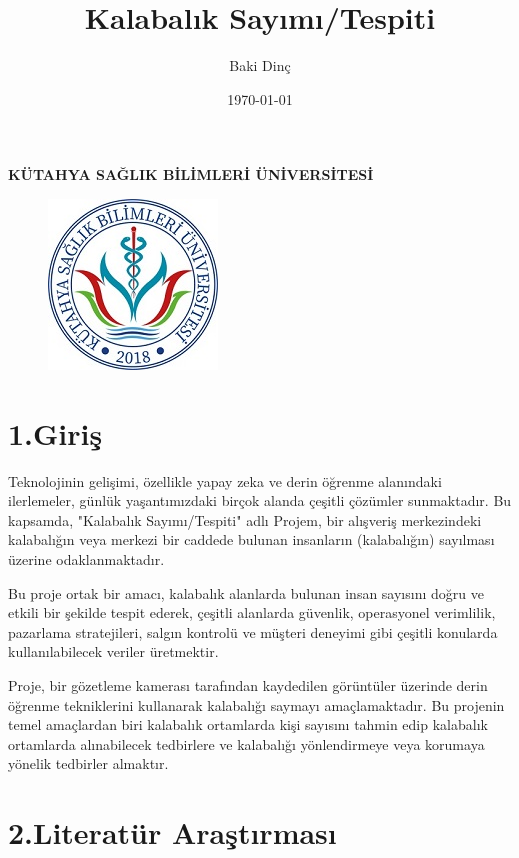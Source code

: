 \documentclass[10pt,a4paper]{report}
\title{Kalabalık Sayımı/Tespiti }
\date{\today}
\author{Baki Dinç}
\begin{document}
	\textbf{KÜTAHYA SAĞLIK BİLİMLERİ ÜNİVERSİTESİ}\centering
	\begin{figure}[!h]
		\centering
		\includegraphics{ksbu}
		\maketitle
	\end{figure}
	
	
	\newpage
	
	\raggedright\section*{1.Giriş}
	\raggedright
Teknolojinin gelişimi, özellikle yapay zeka ve derin öğrenme alanındaki ilerlemeler, günlük yaşantımızdaki birçok alanda çeşitli çözümler sunmaktadır. Bu kapsamda, "Kalabalık Sayımı/Tespiti" adlı Projem, bir alışveriş merkezindeki kalabalığın veya merkezi bir caddede bulunan insanların (kalabalığın) sayılması üzerine odaklanmaktadır.\newline



Bu proje ortak bir amacı, kalabalık alanlarda bulunan insan sayısını doğru ve etkili bir şekilde tespit ederek, çeşitli alanlarda güvenlik, operasyonel verimlilik, pazarlama stratejileri, salgın kontrolü ve müşteri deneyimi gibi çeşitli konularda kullanılabilecek veriler üretmektir.\newline



Proje, bir gözetleme kamerası tarafından kaydedilen görüntüler üzerinde derin öğrenme tekniklerini kullanarak kalabalığı saymayı amaçlamaktadır.
Bu projenin temel amaçlardan biri kalabalık ortamlarda kişi sayısını tahmin edip kalabalık ortamlarda alınabilecek tedbirlere ve kalabalığı yönlendirmeye veya korumaya yönelik tedbirler almaktır.\newline



	\raggedright\section*{2.Literatür Araştırması}
	
\end{document}
